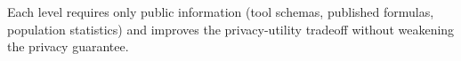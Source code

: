 \noindent Each level requires only public information (tool schemas, published formulas, population statistics) and improves the privacy-utility tradeoff without weakening the privacy guarantee.
 
